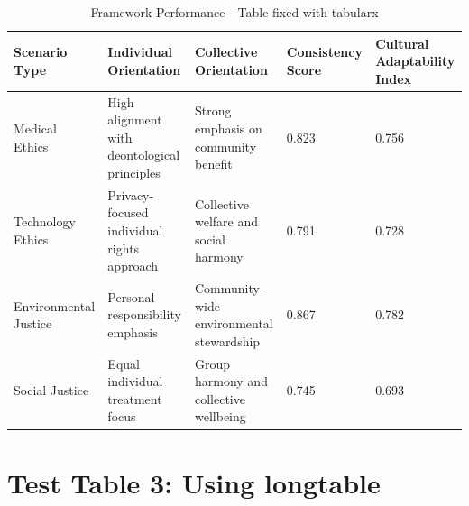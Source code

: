 \documentclass[11pt,a4paper]{article}
\begin{document}
\begin{table}[htbp]
\centering
\begin{tabularx}{\textwidth}{|l|X|X|X|X|}
\hline
\textbf{Scenario Type} & \textbf{Individual Orientation} & \textbf{Collective Orientation} & \textbf{Consistency Score} & \textbf{Cultural Adaptability Index} \\
\hline
Medical Ethics & High alignment with deontological principles & Strong emphasis on community benefit & 0.823 & 0.756 \\
\hline
Technology Ethics & Privacy-focused individual rights approach & Collective welfare and social harmony & 0.791 & 0.728 \\
\hline
Environmental Justice & Personal responsibility emphasis & Community-wide environmental stewardship & 0.867 & 0.782 \\
\hline
Social Justice & Equal individual treatment focus & Group harmony and collective wellbeing & 0.745 & 0.693 \\
\hline
\end{tabularx}
\caption{Framework Performance - Table fixed with tabularx}
\label{tab:framework_performance}
\end{table}

\section{Test Table 3: Using longtable}
\end{document}
